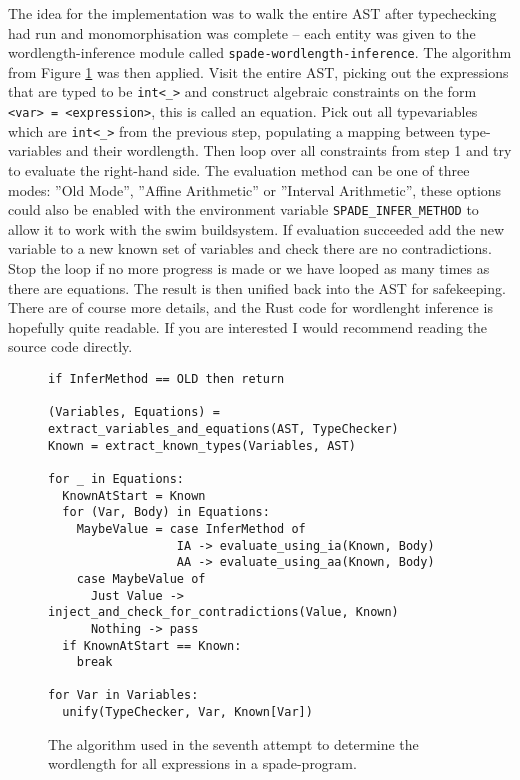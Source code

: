 \documentclass[msc,lith,english]{liuthesis}
\begin{document}
The idea for the implementation was to walk the entire AST after typechecking had run and monomorphisation was complete -- each entity was given to the wordlength-inference module called \verb+spade-wordlength-inference+. The algorithm from Figure \ref{fig:WLIAlgo} was then applied. Visit the entire AST, picking out the expressions that are typed to be \verb+int<_>+ and construct algebraic constraints on the form \verb+<var> = <expression>+, this is called an equation. Pick out all typevariables which are \verb+int<_>+ from the previous step, populating a mapping between type-variables and their wordlength. Then loop over all constraints from step 1 and try to evaluate the right-hand side. The evaluation method can be one of three modes: ''Old Mode'', ''Affine Arithmetic'' or ''Interval Arithmetic'', these options could also be enabled with the environment variable \verb+SPADE_INFER_METHOD+ to allow it to work with the swim buildsystem. If evaluation succeeded add the new variable to a new known set of variables and check there are no contradictions. Stop the loop if no more progress is made or we have looped as many times as there are equations. The result is then unified back into the AST for safekeeping. There are of course more details, and the Rust code for wordlenght inference is hopefully quite readable. If you are interested I would recommend reading the source code directly. 

\begin{figure}
\begin{verbatim}
if InferMethod == OLD then return

(Variables, Equations) = extract_variables_and_equations(AST, TypeChecker)
Known = extract_known_types(Variables, AST)

for _ in Equations:
  KnownAtStart = Known
  for (Var, Body) in Equations:
    MaybeValue = case InferMethod of
                  IA -> evaluate_using_ia(Known, Body)
                  AA -> evaluate_using_aa(Known, Body)
    case MaybeValue of
      Just Value -> inject_and_check_for_contradictions(Value, Known)
      Nothing -> pass
  if KnownAtStart == Known:
    break

for Var in Variables:
  unify(TypeChecker, Var, Known[Var])
\end{verbatim}
\caption{The algorithm used in the seventh attempt to determine the wordlength for all expressions in a spade-program.}
\label{fig:WLIAlgo}
\end{figure}
\end{document}
